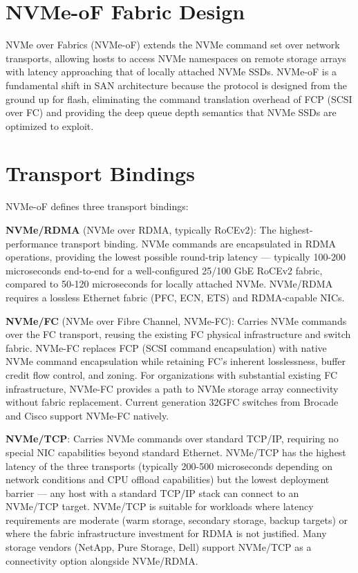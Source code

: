 \section{NVMe-oF Fabric Design}
NVMe over Fabrics (NVMe-oF) extends the NVMe command set over network transports, allowing hosts to access NVMe namespaces on remote storage arrays with latency approaching that of locally attached NVMe SSDs. NVMe-oF is a fundamental shift in SAN architecture because the protocol is designed from the ground up for flash, eliminating the command translation overhead of FCP (SCSI over FC) and providing the deep queue depth semantics that NVMe SSDs are optimized to exploit.

\section{Transport Bindings}
NVMe-oF defines three transport bindings:

\textbf{NVMe/RDMA} (NVMe over RDMA, typically RoCEv2): The highest-performance transport binding. NVMe commands are encapsulated in RDMA operations, providing the lowest possible round-trip latency --- typically 100-200 microseconds end-to-end for a well-configured 25/100 GbE RoCEv2 fabric, compared to 50-120 microseconds for locally attached NVMe. NVMe/RDMA requires a lossless Ethernet fabric (PFC, ECN, ETS) and RDMA-capable NICs.

\textbf{NVMe/FC} (NVMe over Fibre Channel, NVMe-FC): Carries NVMe commands over the FC transport, reusing the existing FC physical infrastructure and switch fabric. NVMe-FC replaces FCP (SCSI command encapsulation) with native NVMe command encapsulation while retaining FC's inherent losslessness, buffer credit flow control, and zoning. For organizations with substantial existing FC infrastructure, NVMe-FC provides a path to NVMe storage array connectivity without fabric replacement. Current generation 32GFC switches from Brocade and Cisco support NVMe-FC natively.

\textbf{NVMe/TCP}: Carries NVMe commands over standard TCP/IP, requiring no special NIC capabilities beyond standard Ethernet. NVMe/TCP has the highest latency of the three transports (typically 200-500 microseconds depending on network conditions and CPU offload capabilities) but the lowest deployment barrier --- any host with a standard TCP/IP stack can connect to an NVMe/TCP target. NVMe/TCP is suitable for workloads where latency requirements are moderate (warm storage, secondary storage, backup targets) or where the fabric infrastructure investment for RDMA is not justified. Many storage vendors (NetApp, Pure Storage, Dell) support NVMe/TCP as a connectivity option alongside NVMe/RDMA.

